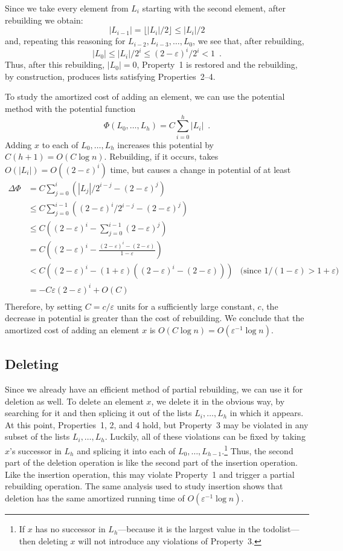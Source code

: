 \documentclass[lotsofwhite]{patmorin}
\newcommand{\eps}{\varepsilon}
\begin{document}
Since we take every element from $L_i$ starting with the second element,
after rebuilding we obtain:
\[
   |L_{i-1}| = \lfloor |L_i|/2 \rfloor \le |L_i|/2
\]
and, repeating this reasoning for $L_{i-2}, L_{i-3},\ldots, L_0$, we see that, after rebuilding,
\[
   |L_{0}| \le |L_i|/2^i \le (2-\eps)^i/2^i < 1 \enspace .
\]
Thus, after this rebuilding, $|L_0|=0$, Property~1 is restored and the
rebuilding, by construction, produces lists satisfying Properties~2--4.

To study the amortized cost of adding an element, we
can use the potential method with the potential function
\[
    \Phi(L_0,\ldots,L_h)=C\sum_{i=0}^h|L_i| \enspace .
\]
Adding $x$ to each of $L_0,\ldots,L_h$ increases this potential by
$C(h+1)=O(C\log n)$.  Rebuilding, if it occurs, takes $O(|L_i|)=O((2-\eps)^i)$
time, but causes a change in potential of at least
\begin{align*}
     \Delta\Phi & = C\sum_{j=0}^i\left(|L_j|/2^{i-j} - (2-\eps)^j\right) \\
          & \le C\sum_{j=0}^{i-1}\left((2-\eps)^i/2^{i-j} - (2-\eps)^j\right) \\
          & \le C\left((2-\eps)^i - \sum_{j=0}^{i-1}(2-\eps)^j\right) \\
          & = C\left((2-\eps)^i - \frac{(2-\eps)^i-(2-\eps)}{1-\eps}\right) \\
          & < C\left((2-\eps)^i - (1+\eps)\left((2-\eps)^i-(2-\eps)\right)\right)
           & \text{(since $1/(1-\eps)>1+\eps$)} \\
          & = -C\eps(2-\eps)^i + O(C) \\
\end{align*}
Therefore, by setting $C=c/\eps$ units for a sufficiently large constant,
$c$, the decrease in potential is greater than the cost of rebuilding.
We conclude that the amortized cost of adding an element $x$ is $O(C\log
n)=O(\eps^{-1}\log n)$.

\subsection{Deleting}

Since we already have an efficient method of partial rebuilding, we
can use it for deletion as well. To delete an element $x$, we delete
it in the obvious way, by searching for it and then splicing it out
of the lists $L_i,\ldots,L_h$ in which it appears.  At this point,
Properties~1, 2, and 4 hold, but Property~3 may be violated in any
subset of the lists $L_i,\ldots,L_h$.  Luckily, all of these violations
can be fixed by taking $x$'s successor in $L_h$ and splicing it into
each of $L_0,\ldots,L_{h-1}$.\footnote{If $x$ has no successor in
$L_h$---because it is the largest value in the todolist---then deleting
$x$ will not introduce any violations of Property~3.}  Thus, the second
part of the deletion operation is like the second part of the insertion
operation.  Like the insertion operation, this may violate Property~1
and trigger a partial rebuilding operation.  The same analysis used to
study insertion shows that deletion has the same amortized running time
of $O(\eps^{-1}\log n)$.
\end{document}
